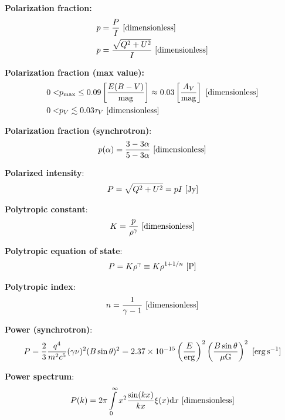 \documentclass[a4paper,10pt]{article}
\begin{document}
{\noindent}\textbf{Polarization fraction:}
\begin{align*}
    p &= \dfrac{P}{I} ~ [{\rm dimensionless}] \\
    p &= \frac{\sqrt{Q^2+U^2}}{I} ~ [{\rm dimensionless}]
\end{align*}

{\noindent}\textbf{Polarization fraction (max value):}
\begin{align*}
    0 < &p_\mathrm{max} \leq 0.09 \left[\frac{E(B-V)}{{\rm mag}}\right] \approx 0.03\left[\frac{A_V}{{\rm mag}}\right] ~ [{\rm dimensionless}] \\
    0 < &p_V \lesssim 0.03\tau_V ~ [{\rm dimensionless}]
\end{align*}

{\noindent}\textbf{Polarization fraction (synchrotron)}:
\begin{align*}
    p(\alpha) = \frac{3-3\alpha}{5-3\alpha} ~ [{\rm dimensionless}]
\end{align*}

{\noindent}\textbf{Polarized intensity}:
\begin{align*}
    P = \sqrt{Q^2 + U^2} = pI ~ [{\rm Jy}]
\end{align*}

{\noindent}\textbf{Polytropic constant}:
\begin{align*}
    K = \frac{p}{\rho^\gamma} ~ [{\rm dimensionless}]
\end{align*}

{\noindent}\textbf{Polytropic equation of state}:
\begin{align*}
    P = K\rho^\gamma \equiv K\rho^{1+1/n} ~ [{\rm P}]
\end{align*}

{\noindent}\textbf{Polytropic index}:
\begin{align*}
    n = \frac{1}{\gamma-1} ~ [{\rm dimensionless}]
\end{align*}

{\noindent}\textbf{Power (synchrotron)}:
\begin{align*}
    P = \frac{2}{3}\frac{q^4}{m^2c^5} (\gamma\nu)^2 (B\sin\theta)^2 = 2.37\times10^{-15} \left(\frac{E}{{\rm erg}}\right)^2 \left(\frac{B\sin\theta}{\mu{\rm G}}\right)^2 ~ [{\rm erg\,s^{-1}}]
\end{align*}

{\noindent}\textbf{Power spectrum}:
\begin{align*}
    P(k) = 2\pi \int\limits_0^\infty x^2\frac{\sin(kx)}{kx}\xi(x)\mathrm{d}x ~ [{\rm dimensionless}]
\end{align*}
\end{document}
